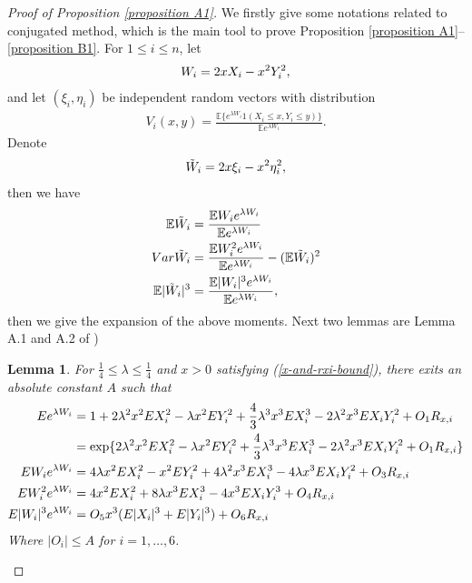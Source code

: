 \documentclass[bj,authoryear]{imsart}
\numberwithin{equation}{section}
\theoremstyle{plain}
\newtheorem{lem}{Lemma}[section]
\theoremstyle{definition}
\begin{document}
\begin{proof}[Proof of Proposition \ref{proposition A1}]
We firstly give some notations related to conjugated method, which is the main tool to prove Proposition \ref{proposition A1}--\ref{proposition B1}. 
For $1\leq i \leq n$, let
\begin{align}
  W_i = 2xX_i-x^2Y_{i}^{2},\notag
\end{align}
and let $(\xi_i,\eta_i)$ be independent random vectors with distribution
\begin{align}
  V_i(x,y) = \frac{\mathbb{E}\{e^{\lambda W_i}1(X_i\leq x,Y_i\leq y)\}}{\mathbb{E} e^{\lambda W_i}}.\label{change-of-measure-distribution}
\end{align}
Denote 
\begin{align}
  \tilde{W}_i = 2x\xi_i-x^2\eta_i^2,\notag
\end{align}
then we have
\begin{align}
  \mathbb{E} \tilde{W}_i &= \frac{\mathbb{E} W_ie^{\lambda W_i}}{\mathbb{E} e^{\lambda W_i}}\notag\\
  Var\tilde{W}_i& = \frac{\mathbb{E} W_{i}^{2}e^{\lambda W_i}}{\mathbb{E} e^{\lambda W_i}}-(\mathbb{E} \tilde{W}_i)^2\notag\\
  \mathbb{E}|\tilde{W}_i|^3 &= \frac{\mathbb{E}|W_i|^3e^{\lambda W_i}}{\mathbb{E} e^{\lambda W_i}},\notag
\end{align}
then we give the expansion of the above moments. Next two lemmas are Lemma A.1 and A.2 of \cite{gao2022refined})

\begin{lem}\label{lem-expansion-mgf}
For $\frac{1}{4}\leq \lambda\leq \frac{1}{4}$ and $x>0$ satisfying (\ref{x-and-rxi-bound}), there exits an absolute constant $A$ such that 
\begin{align}
  Ee^{\lambda W_i} &= 1+2\lambda^2x^2EX_i^2-\lambda x^2EY_i^2+\frac{4}{3}\lambda^3x^3EX_i^3-2\lambda^2 x^3EX_iY_i^2+O_1R_{x,i}\notag\\
  & = \exp\{2\lambda^2x^2EX_i^2-\lambda x^2EY_i^2+\frac{4}{3}\lambda^3x^3EX_i^3-2\lambda^2 x^3EX_iY_i^2+O_1R_{x,i}\}\\
  EW_ie^{\lambda W_i}& = 4\lambda x^2EX_i^2-x^2EY_i^2+4\lambda^2x^3EX_i^3-4\lambda x^3EX_iY_i^2+O_3R_{x,i}\\
  EW_i^2e^{\lambda W_i}& = 4x^2EX_i^2+8\lambda x^3EX_i^3-4x^3EX_iY_i^3+O_4R_{x,i}\\
  E|W_i|^3e^{\lambda W_i}& = O_5x^3(E|X_i|^3+E|Y_i|^3)+O_6R_{x,i}
\end{align}
Where $|O_i|\leq A$ for $i=1,\dots,6$.
\end{lem}


\end{proof}
\end{document}
